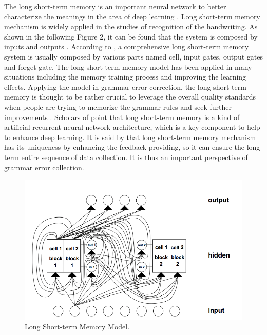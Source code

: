 The long short-term memory is an important neural network to better characterize the meanings in the area of deep learning \cite{hochreiter1997long}. Long short-term memory mechanism is widely applied in the studies of recognition of the handwriting. As shown in the following Figure 2, it can be found that the system is composed by inputs and outputs \cite{hochreiter1997long}. According to \cite{hochreiter1997long}, a comprehensive long short-term memory system is usually composed by various parts named cell, input gates, output gates and forget gate. The long short-term memory model has been applied in many situations including the memory training process and improving the learning effects. Applying the model in grammar error correction, the long short-term memory is thought to be rather crucial to leverage the overall quality standards when people are trying to memorize the grammar rules and seek further improvements \cite{zheng2016chinese}. Scholars of \cite{hochreiter1997long} point that long short-term memory is a kind of artificial recurrent neural network architecture, which is a key component to help to enhance deep learning. It is said by \cite{hochreiter1997long} that long short-term memory mechanism has its uniqueness by enhancing the feedback providing, so it can ensure the long-term entire sequence of data collection. It is thus an important perspective of grammar error collection. 


\begin{figure}[ht]
    \centering
    \includegraphics[width=\textwidth]{LSTM.png}
    \caption{Long Short-term Memory Model.}
    \label{fig:3}
\end{figure}